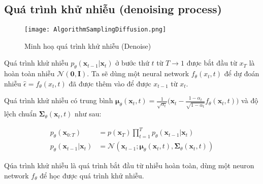\subsection{Quá trình khử nhiễu (denoising process)}
\label{subsection:denoising_process}

\setcounter{figure}{6}
\begin{figure}[H]
	\centering
	\texttt{[image: AlgorithmSamplingDiffusion.png]}
	\caption{Minh hoạ quá trình khử nhiễu (Denoise)}
	\label{fig:AlgorithmSamplingDiffusion}
	\vspace{-20pt}
\end{figure}

Quá trình khử nhiễu $p_\theta(\mathbf{x}_{t-1} \vert \mathbf{x}_t)$  ở bước thứ $t$ từ $T \to 1$ được bắt đầu từ $x_T$ là hoàn toàn nhiễu $\mathcal{N} (\mathbf{0}, \mathbf{I})$. Ta sẽ dùng một neural network $f_{\theta} (x_t, t)$ để dự đoán nhiễu $\hat{\epsilon} = f_{\theta}(x_t, t)$ đã được thêm vào để được $x_{t-1}$ từ $x_t$.

Quá trình khử nhiễu có trung bình $\boldsymbol{\mu}_\theta(\mathbf{x}_t, t) = {\frac{1}{\sqrt{\alpha_t}} \Big( \mathbf{x}_t - \frac{1 - \alpha_t}{\sqrt{1 - \bar{\alpha}_t}}  f_\theta(\mathbf{x}_t, t) \Big)}$ và độ lệch chuẩn $\boldsymbol{\Sigma}_\theta(\mathbf{x}_t, t)$ như sau:




\begin{equation}
	\label{eq:denoising_process}
	\begin{aligned}
		p_\theta(\mathbf{x}_{0:T})
		&= p(\mathbf{x}_T) \prod^T_{t=1} p_\theta(\mathbf{x}_{t-1} \vert \mathbf{x}_t) \\
		p_\theta(\mathbf{x}_{t-1} \vert \mathbf{x}_t) &= \mathcal{N}(\mathbf{x}_{t-1};  \boldsymbol{\mu}_\theta(\mathbf{x}_t, t), \boldsymbol{\Sigma}_\theta(\mathbf{x}_t, t))
	\end{aligned}
\end{equation}

Qúa trình khử nhiễu là quá trình bắt đầu từ nhiễu hoàn toàn, dùng một neuron network $f_\theta$ để học được quá trình khử nhiễu.



